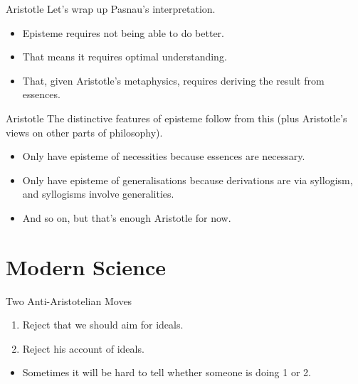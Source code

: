 \documentclass[
  17pt,
  letterpaper,
  ignorenonframetext,
  aspectratio=169,
  handout]{beamer}
\providecommand{\tightlist}{%
  \setlength{\itemsep}{0pt}\setlength{\parskip}{0pt}}\usepackage{longtable,booktabs,array}
\begin{document}
\begin{frame}{Aristotle}
\protect\hypertarget{aristotle-2}{}
Let's wrap up Pasnau's interpretation.

\begin{itemize}[<+->]
\tightlist
\item
  Episteme requires not being able to do better.
\item
  That means it requires optimal understanding.
\item
  That, given Aristotle's metaphysics, requires deriving the result from
  essences.
\end{itemize}
\end{frame}

\begin{frame}{Aristotle}
\protect\hypertarget{aristotle-3}{}
The distinctive features of episteme follow from this (plus Aristotle's
views on other parts of philosophy).

\begin{itemize}[<+->]
\tightlist
\item
  Only have episteme of necessities because essences are necessary.
\item
  Only have episteme of generalisations because derivations are via
  syllogism, and syllogisms involve generalities.
\item
  And so on, but that's enough Aristotle for now.
\end{itemize}
\end{frame}

\hypertarget{modern-science}{%
\section{Modern Science}\label{modern-science}}

\begin{frame}{Two Anti-Aristotelian Moves}
\protect\hypertarget{two-anti-aristotelian-moves}{}
\begin{enumerate}[<+->]
\tightlist
\item
  Reject that we should aim for ideals.
\item
  Reject his account of ideals.
\end{enumerate}

\begin{itemize}[<+->]
\tightlist
\item
  Sometimes it will be hard to tell whether someone is doing 1 or 2.
\end{itemize}
\end{frame}
\end{document}
